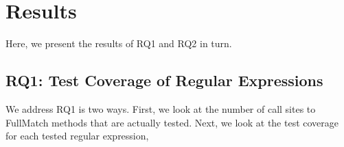 \section{Results}
\label{sec:results}

Here, we present the results of RQ1 and RQ2 in turn.


\subsection{RQ1: Test Coverage of Regular Expressions}
\label{sec:rq2}
\label{rq1:results}


We address RQ1 is two ways. First, we look at the number of call sites to FullMatch methods that are actually tested. Next, we look at the test coverage for each tested regular expression, 

